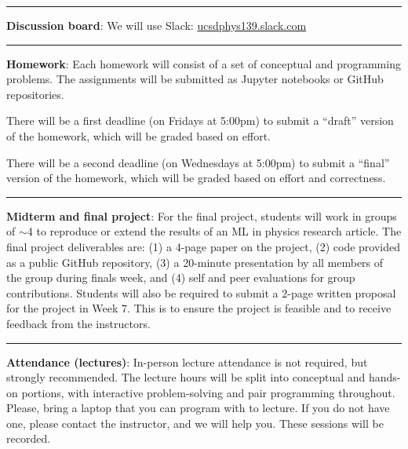 \documentclass[12pt]{article}
\begin{document}
\begin{center}
	\rule{\textwidth}{0.5pt}
\end{center}

\noindent\textbf{Discussion board}: We will use Slack: \href{https://join.slack.com/t/ucsdphys139/shared\_invite/zt-110gwd4lx-pZBsItfcxhbOD5BV6afVDA}{ucsdphys139.slack.com}

\begin{center}
	\rule{\textwidth}{0.5pt}
\end{center}

\noindent\textbf{Homework}: Each homework will consist of a set of conceptual and programming problems.
The assignments will be submitted as Jupyter notebooks or GitHub repositories.

There will be a first deadline (on Fridays at 5:00pm) to submit a ``draft'' version of the homework, which will be graded based on effort.

There will be a second deadline (on Wednesdays at 5:00pm) to submit a ``final'' version of the homework, which will be graded based on effort and correctness.

\begin{center}
	\rule{\textwidth}{0.5pt}
\end{center}

\noindent\textbf{Midterm and final project}:
For the final project, students will work in groups of $\sim$4 to reproduce or extend the results of an ML in physics research article.
The final project deliverables are: (1) a 4-page paper on the project, (2) code provided as a public GitHub repository, (3) a 20-minute presentation by all members of the group during finals week, and (4) self and peer evaluations for group contributions.
Students will also be required to submit a 2-page written proposal for the project in Week 7.
This is to ensure the project is feasible and to receive feedback from the instructors.

\begin{center}
	\rule{\textwidth}{0.5pt}
\end{center}

\noindent\textbf{Attendance (lectures)}: In-person lecture attendance is not required, but strongly recommended.
The lecture hours will be split into conceptual and hands-on portions, with interactive problem-solving and pair programming throughout.
Please, bring a laptop that you can program with to lecture.
If you do not have one, please contact the instructor, and we will help you.
These sessions will be recorded.
\end{document}
